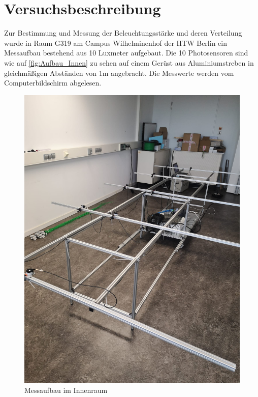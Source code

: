 \section{Versuchsbeschreibung}
\label{section:Versuchsbeschreibung}
Zur Bestimmung und Messung der Beleuchtungsstärke und deren Verteilung wurde in 
Raum G319 am Campus Wilhelminenhof der HTW Berlin ein Messaufbau bestehend aus
10 Luxmeter aufgebaut. Die 10 Photosensoren sind wie auf \autoref{fig:Aufbau_Innen}
zu sehen auf einem Gerüst aus Aluminiumstreben in gleichmäßigen Abständen von 1m
angebracht. Die Messwerte werden vom Computerbildschirm abgelesen. 

\begin{figure}[H]
    \centering
    \includegraphics[scale=0.15]{Abbildungen/Aufbau-Innen.jpg}
    \caption{Messaufbau im Innenraum}
    \label{fig:Aufbau_Innen}
\end{figure}

